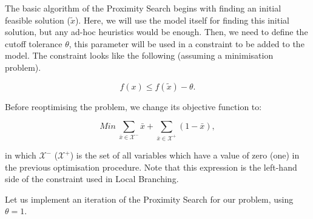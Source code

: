 \documentclass[11pt]{article}
\begin{document}
The basic algorithm of the Proximity Search begins with finding an
initial feasible solution (\(\tilde{x}\)). Here, we will use the model
itself for finding this initial solution, but any ad-hoc heuristics
would be enough. Then, we need to define the cutoff tolerance
\(\theta\), this parameter will be used in a constraint to be added to
the model. The constraint looks like the following (assuming a
minimisation problem).

\[f(x) \leq f(\tilde{x}) - \theta.\]

Before reoptimising the problem, we change its objective function to:

\[Min\ \sum_{\bar{x} \in \mathcal{X}^-} \bar{x} + \sum_{\bar{x} \in \mathcal{X}^+} (1 - \bar{x}),\]

in which \(\mathcal{X}^ -\) (\(\mathcal{X}^+\)) is the set of all
variables which have a value of zero (one) in the previous optimisation
procedure. Note that this expression is the left-hand side of the
constraint used in Local Branching.

Let us implement an iteration of the Proximity Search for our problem,
using \(\theta = 1\).
\end{document}
